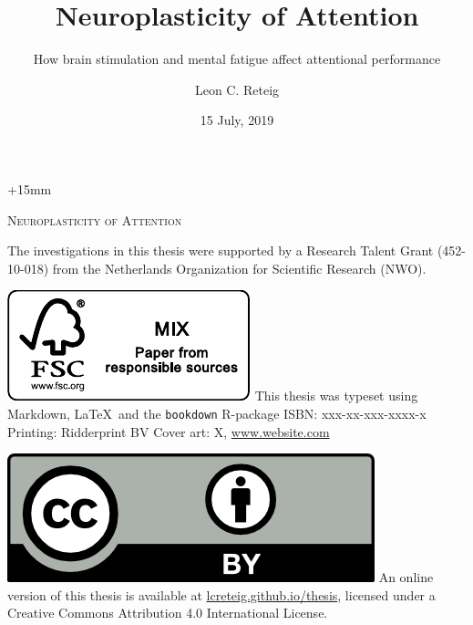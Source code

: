 \documentclass[11pt,]{memoir}
\title{Neuroplasticity of Attention}
\subtitle{How brain stimulation and mental fatigue affect attentional performance}
\author{Leon C. Reteig}
\date{15 July, 2019}
\begin{document}
\maketitle

\setlength{\abstitleskip}{-\absparindent}

\frontmatter
\pagestyle{empty} 

\def\drop{.1\textheight}
\vspace*{\drop}
\begin{adjustwidth}{+15mm}{} %
\begin{center}
\Huge \textsc{Neuroplasticity of Attention} %
\end{center}
\end{adjustwidth}

\clearpage
\vspace*{\fill}
\begingroup %
\small
\setlength{\parskip}{\baselineskip} %
\setlength\parindent{0pt} %
The investigations in this thesis were supported by 
a Research Talent Grant (452-10-018)  %
from 
the Netherlands Organization for Scientific Research (NWO). %

\includegraphics{_bookdown_files/FSC.pdf} \newline
This thesis was typeset using Markdown, \LaTeX\ and the \verb+bookdown+ R-package \newline
ISBN: xxx-xx-xxx-xxxx-x \newline %
Printing: Ridderprint BV \newline %
Cover art: X, \url{www.website.com} %

\includegraphics{_bookdown_files/CC-BY.png} \newline
An online version of this thesis is available at 
\url{lcreteig.github.io/thesis},  %
licensed under a 
Creative Commons Attribution 4.0 International License. %
\endgroup
\end{document}
